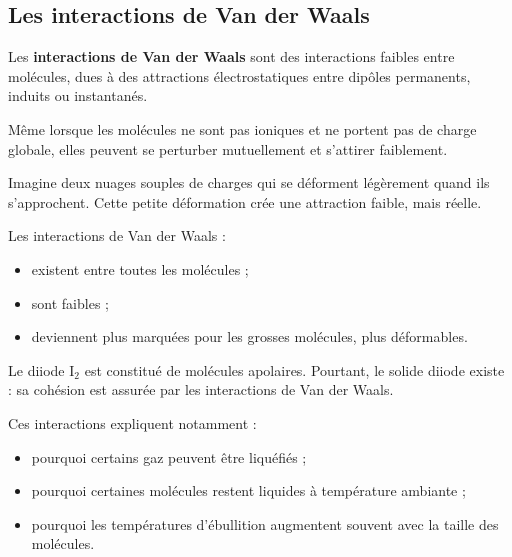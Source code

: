 \documentclass[11pt,a4paper]{article}
\begin{document}
\subsection{Les interactions de Van der Waals}

\begin{definitionbox}
Les \textbf{interactions de Van der Waals} sont des interactions faibles entre molécules, dues à des attractions électrostatiques entre dipôles permanents, induits ou instantanés.
\end{definitionbox}

\begin{comprendrebox}
Même lorsque les molécules ne sont pas ioniques et ne portent pas de charge globale, elles peuvent se perturber mutuellement et s’attirer faiblement.
\end{comprendrebox}

\begin{analogebox}
Imagine deux nuages souples de charges qui se déforment légèrement quand ils s’approchent.  
Cette petite déformation crée une attraction faible, mais réelle.
\end{analogebox}

\begin{proprietebox}
Les interactions de Van der Waals :
\begin{itemize}
    \item existent entre toutes les molécules ;
    \item sont faibles ;
    \item deviennent plus marquées pour les grosses molécules, plus déformables.
\end{itemize}
\end{proprietebox}

\begin{exemplebox}
Le diiode \(\mathrm{I_2}\) est constitué de molécules apolaires.  
Pourtant, le solide diiode existe : sa cohésion est assurée par les interactions de Van der Waals.
\end{exemplebox}

\begin{comprendrebox}
Ces interactions expliquent notamment :
\begin{itemize}
    \item pourquoi certains gaz peuvent être liquéfiés ;
    \item pourquoi certaines molécules restent liquides à température ambiante ;
    \item pourquoi les températures d’ébullition augmentent souvent avec la taille des molécules.
\end{itemize}
\end{comprendrebox}
\end{document}
